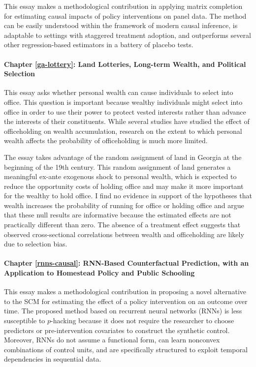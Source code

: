 This essay makes a methodological contribution in applying matrix completion for estimating causal impacts of policy interventions on panel data. The method can be easily understood within the framework of modern causal inference, is adaptable to settings with staggered treatment adoption, and outperforms several other regression-based estimators in a battery of placebo tests.

\paragraph{Chapter \ref{ga-lottery}: Land Lotteries, Long-term Wealth, and Political Selection} 
This essay asks whether personal wealth can cause individuals to select into office. This question is important because wealthy individuals might select into office in order to use their power to protect vested interests rather than advance the interests of their constituents. While several studies have studied the effect of officeholding on wealth accumulation, research on the extent to which personal wealth affects the probability of officeholding is much more limited.

The essay takes advantage of the random assignment of land in Georgia at the beginning of the 19th century. This random assignment of land generates a meaningful ex-ante exogenous shock to personal wealth, which is expected to reduce the opportunity costs of holding office and may make it more important for the wealthy to hold office. I find no evidence in support of the hypotheses that wealth increases the probability of running for office or holding office and argue that these null results are informative because the estimated effects are not practically different than zero. The absence of a treatment effect suggests that observed cross-sectional correlations between wealth and officeholding are likely due to selection bias. 

\paragraph{Chapter \ref{rnns-causal}: RNN-Based Counterfactual Prediction, with an Application to Homestead Policy and Public Schooling}

This essay makes a methodological contribution in proposing a novel alternative to the SCM for estimating the effect of a policy intervention on an outcome over time. The proposed method based on recurrent neural networks (RNNs) is less susceptible to $p$-hacking because it does not require the researcher to choose predictors or pre-intervention covariates to construct the synthetic control. Moreover, RNNs do not assume a functional form, can learn nonconvex combinations of control units, and are specifically structured to exploit temporal dependencies in sequential data.

